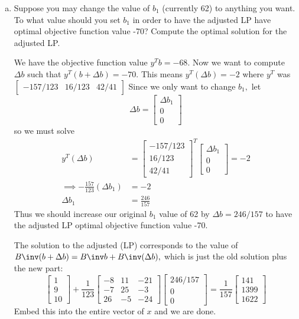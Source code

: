 \documentclass{article}
\begin{document}
\begin{enumerate}
		\begin{enumerate}[a)]
			\item Suppose you may change the value of $b_1$ (currently 62) to anything you want. To what value should you set $b_1$ in order to have the adjusted LP have optimal objective function value -70? Compute the optimal solution for the adjusted LP.
				\begin{soln}
					We have the objective function value $y^T b = -68.$ Now we want to compute $\Delta b$ such that $y^T(b+\Delta b) = -70.$ This means $y^T(\Delta b) = -2$ where $y^T$ was $\begin{bmatrix}
						-157/123 & 16/123 & 42/41
					\end{bmatrix}$ Since we only want to change $b_1,$ let \[\Delta b = \begin{bmatrix}
							\Delta b_1 \\ 0 \\ 0
					\end{bmatrix}\] so we must solve
					\begin{align*}
						y^T (\Delta b) &= \begin{bmatrix}
							-157/123 \\ 16/123 \\ 42/41
						\end{bmatrix}^T \begin{bmatrix}
							\Delta b_1 \\ 0 \\ 0
						\end{bmatrix} = -2 \\
						\implies -\frac{157}{123}(\Delta b_1) &= -2 \\
						\Delta b_1 &= \frac{246}{157}
					\end{align*}
					Thus we should increase our original $b_1$ value of 62 by $\Delta b= 246/157$ to have the adjusted LP optimal objective function value -70.

					The solution to the adjusted (LP) corresponds to the value of $B\inv (b+\Delta b)=B\inv b+ B\inv (\Delta b),$ which is just the old solution plus the new part: \[\begin{bmatrix}
							1 \\ 9 \\ 10
						\end{bmatrix} + \frac{1}{123}\begin{bmatrix}
							-8 & 11 & -21 \\
							-7 & 25 & -3 \\
							26 & -5 & -24
						\end{bmatrix} \begin{bmatrix}
							246/157 \\ 0 \\ 0
						\end{bmatrix} = \frac{1}{157}\begin{bmatrix}
							141 \\ 1399 \\ 1622
					\end{bmatrix}\] Embed this into the entire vector of $x$ and we are done.


\end{soln}
\end{enumerate}
\end{enumerate}
\end{document}
